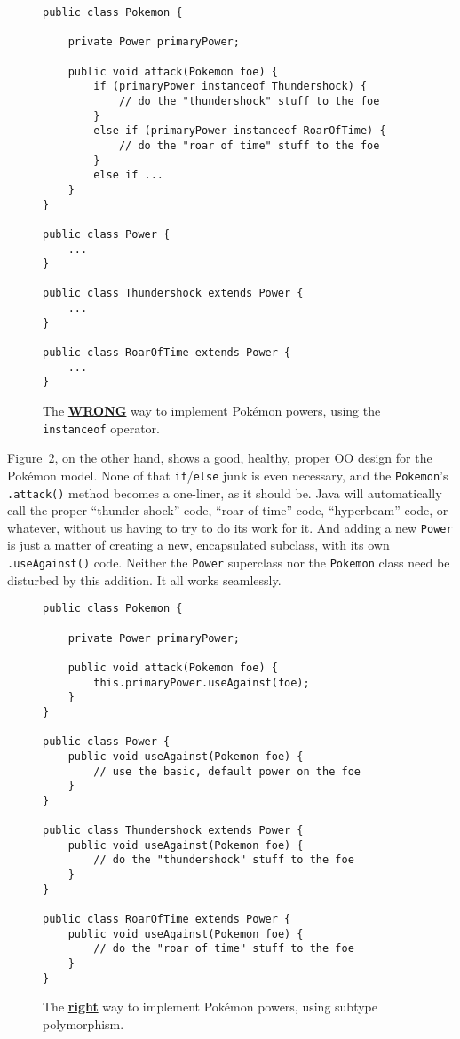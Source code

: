 \begin{figure}[ht]
\begin{Verbatim}[fontsize=\small,samepage=true,frame=single]
public class Pokemon {

    private Power primaryPower;

    public void attack(Pokemon foe) {
        if (primaryPower instanceof Thundershock) {
            // do the "thundershock" stuff to the foe
        }
        else if (primaryPower instanceof RoarOfTime) {
            // do the "roar of time" stuff to the foe
        }       
        else if ...
    }
}

public class Power {
    ...
}

public class Thundershock extends Power {
    ...
}

public class RoarOfTime extends Power {
    ...
}
\end{Verbatim}
\caption{The {\color{red} \underline{\textbf{WRONG}}} way to implement
Pok\'{e}mon powers, using the \texttt{instanceof} operator.}
\label{fig:wrongPokemon}
\end{figure}

Figure~\ref{fig:rightPokemon}, on the other hand, shows a good, healthy,
proper OO design for the Pok\'{e}mon model. None of that
\texttt{if}/\texttt{else} junk is even necessary, and the \texttt{Pokemon}'s
\texttt{.attack()} method becomes a one-liner, as it should be. Java will
automatically call the proper ``thunder shock'' code, ``roar of time'' code,
``hyperbeam'' code, or whatever, without us having to try to do its work for
it. And adding a new \texttt{Power} is just a matter of creating a new,
encapsulated subclass, with its own \texttt{.useAgainst()} code. Neither the
\texttt{Power} superclass nor the \texttt{Pokemon} class need be disturbed by
this addition. It all works seamlessly.

\begin{figure}[ht]
\begin{Verbatim}[fontsize=\small,samepage=true,frame=single]
public class Pokemon {

    private Power primaryPower;

    public void attack(Pokemon foe) {
        this.primaryPower.useAgainst(foe);
    }
}

public class Power {
    public void useAgainst(Pokemon foe) {
        // use the basic, default power on the foe
    }
}

public class Thundershock extends Power {
    public void useAgainst(Pokemon foe) {
        // do the "thundershock" stuff to the foe
    }
}

public class RoarOfTime extends Power {
    public void useAgainst(Pokemon foe) {
        // do the "roar of time" stuff to the foe
    }
}
\end{Verbatim}
\caption{The {\color{darkgreen} \underline{\textbf{right}}} way to implement
Pok\'{e}mon powers, using subtype polymorphism.}
\label{fig:rightPokemon}
\end{figure}
